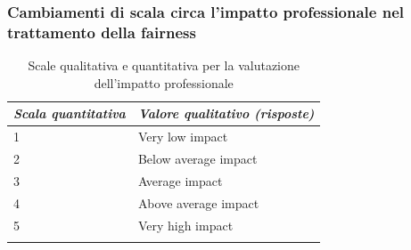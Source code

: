 \subsubsection{Cambiamenti di scala circa l'impatto professionale nel trattamento della fairness}
    
    \begin{center}
		\hspace*{-5mm}%
	\end{center}
	
     \begin{longtable}{| p{} | p{} |} 
      
      \hline\textbf{\textit{Scala quantitativa}} & \textbf{\textit{Valore qualitativo (risposte)}}
       
        
        \\ \hline
        \rowcolor{Gray}
        1       
        
        &  Very low impact



        
        \\ \hline


        2     
        
        & Below average impact




        \\ \hline
        \rowcolor{Gray}
        3     
        
        &  Average impact


        
        \\ \hline


        4    
        
        & Above average impact




        \\ \hline
        
        \rowcolor{Gray}
        5
        
        &  Very high impact


        \\ \hline
        \caption{Scale qualitativa e quantitativa per la valutazione dell'impatto professionale} %
        \label{tab:myfirstlongtable}
    \end{longtable}
    
